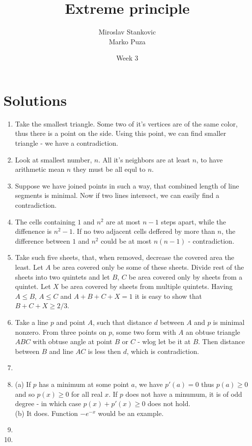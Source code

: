 \documentclass[12pt]{article}
\title{\textbf{Extreme principle}}
\date{Week 3}
\author{Miroslav Stankovic\\ Marko Puza}
\begin{document}
\maketitle

\section{Solutions}

\begin{enumerate}
	\item{Take the smallest triangle. Some two of it's vertices are of the same color, thus there is a point on the side. Using this point, we can find smaller triangle - we have a contradiction.
	}
	
	\item{Look at smallest number, $n$. All it's neighbors are at least $n$, to have arithmetic mean $n$ they must be all equl to $n$.}
	
	\item{Suppose we have joined points in such a way, that combined length of line segments is minimal. Now if two lines intersect, we can easily find a contradiction.}
	
	\item{The cells containing $1$ and $n^2$ are at most $n-1$ steps apart, while the diffenence is $n^2-1$. If no two adjacent cells deffered by more than $n$, the difference between $1$ and $n^2$ could be at most $n(n-1)$ - contradiction.}
	
	\item{Take such five sheets, that, when removed, decrease the covered area the least. Let $A$ be area covered only be some of these sheets. Divide rest of the sheets into two quintets and let $B$, $C$ be area covered only by sheets from a quintet. Let $X$ be area covered by sheets from multiple quintets. Having $A\le B$, $A\le C$ and $A+B+C+X=1$ it is easy to show that $B+C+X \ge 2/3$.}
	
	\item{Take a line $p$ and point $A$, such that distance $d$ between $A$ and $p$ is minimal nonzero. From three points on $p$, some two form with $A$ an obtuse triangle $ABC$ with obtuse angle at point $B$ or $C$ - wlog let be it at $B$. Then distance between $B$ and line $AC$ is less then $d$, which is contradiction.}
	
	\item{}

	\item{(a) If $p$ has a minimum at some point $a$, we have $p'(a)=0$ thus $p(a)\ge 0$ and so $p(x)\ge 0 $ for all real $x$. If $p$ does not have a minumum, it is of odd degree - in which case $p(x) + p'(x) \ge 0$ does not hold.
\\(b) It does. Function $-e^{-x}$ would be an example.}
	
	\item{}
	
	\item{}


\end{enumerate}
\end{document}
